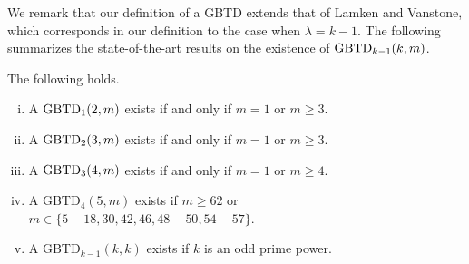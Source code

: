 \documentclass[draft, 11pt]{article}
\begin{document}

We remark that our definition of a GBTD extends that of
Lamken and Vanstone\cite{LamkenVanstone:1989}, which corresponds in our definition to
the case when $\lambda=k-1$.
The following summarizes the state-of-the-art results on the existence of
$\textrm{GBTD}_{k-1}(k,m)$.

\begin{theorem}
\label{lamkenyin}
The following holds.
\begin{enumerate}[(i)]
\item A $\textrm{GBTD}_1(2,m)$ exists if and only if $m=1$ or $m\ge 3$.
\item A $\textrm{GBTD}_2(3,m)$ exists if and only if $m=1$ or $m\ge 3$.
\item A $\textrm{GBTD}_3(4,m)$ exists if and only if $m=1$ or $m\ge 4$.
\item A GBTD$_4(5,m)$ exists if $m\ge 62$ or $m\in \{5-18,30,42,46,48-50,54-57\}$.
\item A GBTD$_{k-1}(k,k)$ exists if $k$ is an odd prime power.
\end{enumerate}
\end{theorem}
\end{document}
